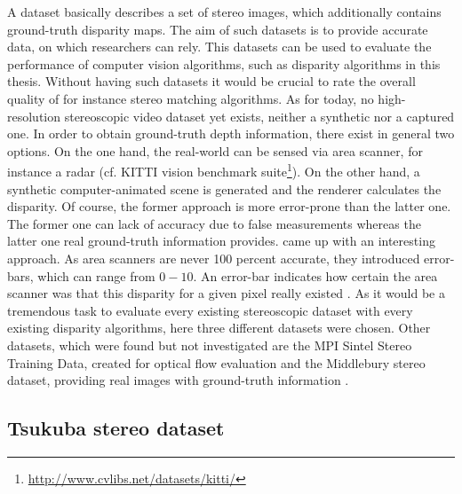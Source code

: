 A dataset basically describes a set of stereo images, which additionally contains ground-truth disparity maps.
The aim of such datasets is to provide accurate data, on which researchers can rely.
This datasets can be used to evaluate the performance of computer vision algorithms, such as disparity algorithms in this thesis.
Without having such datasets it would be crucial to rate the overall quality of for instance stereo matching algorithms.
As for today, no high-resolution stereoscopic video dataset yet exists, neither a synthetic nor a captured one.
In order to obtain ground-truth depth information, there exist in general two options.
On the one hand, the real-world can be sensed via area scanner, for instance a radar (cf. KITTI vision benchmark suite\footnote{\url{http://www.cvlibs.net/datasets/kitti/}}).
On the other hand, a synthetic computer-animated scene is generated and the renderer calculates the disparity.
Of course, the former approach is more error-prone than the latter one.
The former one can lack of accuracy due to false measurements whereas the latter one real ground-truth information provides.
\newline\newline\noindent \citeauthor{kondermann2015stereo} came up with an interesting approach.
As area scanners are never 100 percent accurate, they introduced error-bars, which can range from $0-10$.
An error-bar indicates how certain the area scanner was that this disparity for a given pixel really existed \citep{kondermann2015stereo}.
\newline\newline\noindent As it would be a tremendous task to evaluate every existing stereoscopic dataset with every existing disparity algorithms, here three different datasets were chosen.
\newline\newline\noindent Other datasets, which were found but not investigated are the MPI Sintel Stereo Training Data, created for optical flow evaluation \citep{Butler:ECCV:2012} and the Middlebury stereo dataset, providing real images with ground-truth information \citep{scharstein2006middlebury}.

\subsection*{Tsukuba stereo dataset}

